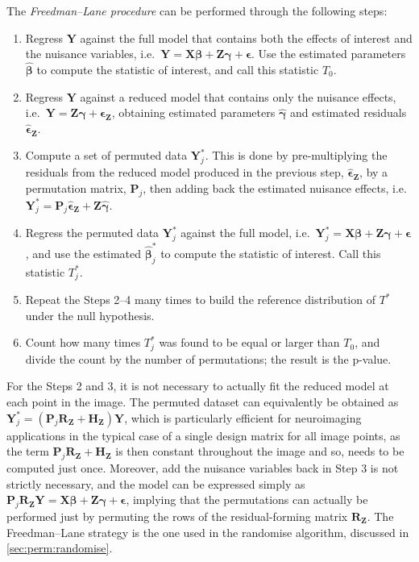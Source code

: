 The \emph{Freedman--Lane procedure} \citep{Freedman1983} can be performed through the following steps:

\begin{enumerate}
\item Regress $\mathbf{Y}$ against the full model that contains both the effects of interest and the nuisance variables, i.e.\ $\mathbf{Y} = \mathbf{X}\boldsymbol{\beta} + \mathbf{Z}\boldsymbol{\gamma} + \boldsymbol{\epsilon}$. Use the estimated parameters $\boldsymbol{\hat{\beta}}$ to compute the statistic of interest, and call this statistic $T_{0}$.
\item Regress $\mathbf{Y}$ against a reduced model that contains only the nuisance effects, i.e.\ $\mathbf{Y} = \mathbf{Z}\boldsymbol{\gamma} + \boldsymbol{\epsilon}_{\mathbf{Z}}$, obtaining estimated parameters $\boldsymbol{\hat{\gamma}}$ and estimated residuals $\boldsymbol{\hat{\epsilon}}_{\mathbf{Z}}$.
\item Compute a set of permuted data $\mathbf{Y}^{*}_{j}$. This is done by pre-multiplying the residuals from the reduced model produced in the previous step, $\boldsymbol{\hat{\epsilon}}_{\mathbf{Z}}$, by a permutation matrix, $\mathbf{P}_{j}$, then adding back the estimated nuisance effects, i.e.\ $\mathbf{Y}^{*}_{j} = \mathbf{P}_{j}\boldsymbol{\hat{\epsilon}}_{\mathbf{Z}} + \mathbf{Z}\boldsymbol{\hat{\gamma}}$. 
\item Regress the permuted data $\mathbf{Y}^{*}_{j}$ against the full model, i.e.\ $\mathbf{Y}^{*}_{j} = \mathbf{X}\boldsymbol{\beta} + \mathbf{Z}\boldsymbol{\gamma} + \boldsymbol{\epsilon}$, and use the estimated $\boldsymbol{\hat{\beta}}^{*}_{j}$ to compute the statistic of interest. Call this statistic $T^{*}_{j}$.
\item Repeat the Steps 2--4 many times to build the reference distribution of $T^{*}$ under the null hypothesis.
\item Count how many times $T^{*}_{j}$ was found to be equal or larger than $T_{0}$, and divide the count by the number of permutations; the result is the p-value.
\end{enumerate}

For the Steps 2 and 3, it is not necessary to actually fit the reduced model at each point in the image. The permuted dataset can equivalently be obtained as $\mathbf{Y}^{*}_{j} = \left(\mathbf{P}_{j}\mathbf{R}_{\mathbf{Z}}+\mathbf{H}_{\mathbf{Z}}\right)\mathbf{Y}$, which is particularly efficient for neuroimaging applications in the typical case of a single design matrix for all image points, as the term $\mathbf{P}_{j}\mathbf{R}_{\mathbf{Z}}+\mathbf{H}_{\mathbf{Z}}$ is then constant throughout the image and so, needs to be computed just once. Moreover, add the nuisance variables back in Step 3 is not strictly necessary, and the model can be expressed simply as $\mathbf{P}_{j}\mathbf{R}_{\mathbf{Z}}\mathbf{Y}=\mathbf{X}\boldsymbol{\beta}+\mathbf{Z}\boldsymbol{\gamma}+\boldsymbol{\epsilon}$, implying that the permutations can actually be performed just by permuting the rows of the residual-forming matrix $\mathbf{R}_{\mathbf{Z}}$. The Freedman--Lane strategy is the one used in the randomise algorithm, discussed in \ref{sec:perm:randomise}.

